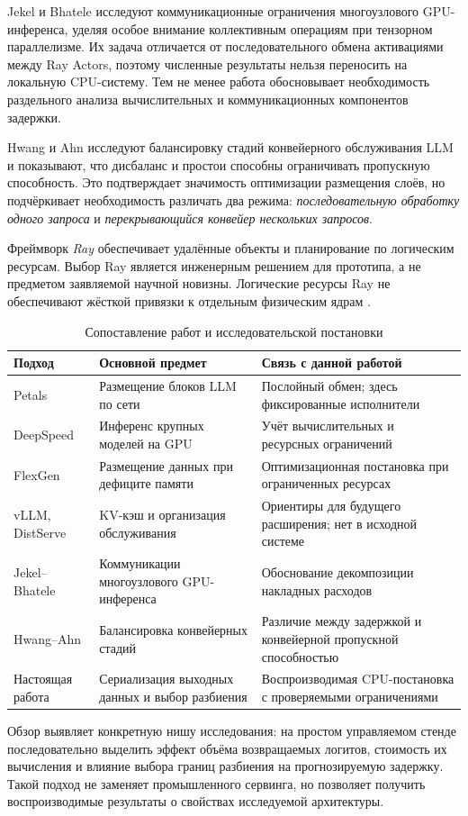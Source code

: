 Jekel и Bhatele \cite{jekel2026} исследуют коммуникационные ограничения многоузлового GPU-инференса, уделяя особое внимание коллективным операциям при тензорном параллелизме. Их задача отличается от последовательного обмена активациями между Ray Actors, поэтому численные результаты нельзя переносить на локальную CPU-систему. Тем не менее работа обосновывает необходимость раздельного анализа вычислительных и коммуникационных компонентов задержки.

Hwang и Ahn \cite{hwang2026} исследуют балансировку стадий конвейерного обслуживания LLM и показывают, что дисбаланс и простои способны ограничивать пропускную способность. Это подтверждает значимость оптимизации размещения слоёв, но подчёркивает необходимость различать два режима: \emph{последовательную обработку одного запроса} и \emph{перекрывающийся конвейер нескольких запросов}.

Фреймворк \emph{Ray} \cite{ray2018} обеспечивает удалённые объекты и планирование по логическим ресурсам. Выбор Ray является инженерным решением для прототипа, а не предметом заявляемой научной новизны. Логические ресурсы Ray не обеспечивают жёсткой привязки к отдельным физическим ядрам \cite{rayresources}.

\begin{table}[t]
\centering\small
\caption{Сопоставление работ и исследовательской постановки}
\label{tab:related}
\begin{tabularx}{\textwidth}{@{}p{2.55cm}X X@{}}
\toprule
\textbf{Подход} & \textbf{Основной предмет} & \textbf{Связь с данной работой}\\
\midrule
Petals \cite{petals2023} & Размещение блоков LLM по сети & Послойный обмен; здесь фиксированные исполнители\\
DeepSpeed \cite{deepspeed2022} & Инференс крупных моделей на GPU & Учёт вычислительных и ресурсных ограничений\\
FlexGen \cite{flexgen2023} & Размещение данных при дефиците памяти & Оптимизационная постановка при ограниченных ресурсах\\
vLLM, DistServe \cite{vllm2023,distserve2024} & KV-кэш и организация обслуживания & Ориентиры для будущего расширения; нет в исходной системе\\
Jekel--Bhatele \cite{jekel2026} & Коммуникации многоузлового GPU-инференса & Обоснование декомпозиции накладных расходов\\
Hwang--Ahn \cite{hwang2026} & Балансировка конвейерных стадий & Различие между задержкой и конвейерной пропускной способностью\\
Настоящая работа & Сериализация выходных данных и выбор разбиения & Воспроизводимая CPU-постановка с проверяемыми ограничениями\\
\bottomrule
\end{tabularx}
\end{table}

Обзор выявляет конкретную нишу исследования: на простом управляемом стенде последовательно выделить эффект объёма возвращаемых логитов, стоимость их вычисления и влияние выбора границ разбиения на прогнозируемую задержку. Такой подход не заменяет промышленного сервинга, но позволяет получить воспроизводимые результаты о свойствах исследуемой архитектуры.
